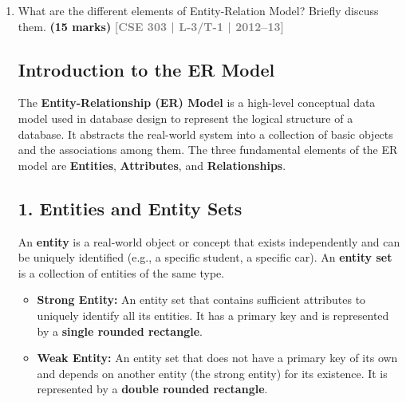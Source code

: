 \documentclass[12pt,a3paper]{article}
\newcommand{\yr}[1]{\hfill\textcolor{gray}{\small\textbf{[#1]}}}
\newcommand{\mk}[1]{\textcolor{orange!70!black}{\small\textbf{(#1 marks)}}}
\begin{document}
\begin{enumerate}
\begin{tcolorbox}[enhanced,breakable,ansbox,colback=cA!4,colframe=cA,boxrule=0.8pt,arc=5pt,title={\textbf{Answer}},fonttitle=\bfseries\color{white},colbacktitle=cA]
\textbf{Explanation of the Mapping:}
\begin{enumerate}
    \item \textbf{\texttt{EMPLOYEE(Emp\_ID, Name)}:} The original entity becomes a table, holding only the single-valued attributes. \texttt{Emp\_ID} remains the Primary Key.
    \item \textbf{\texttt{EMP\_SKILL(Emp\_ID, Skill)}:} The multi-valued attribute \texttt{Skill} gets its own table. To link the skill to the correct employee, we import \texttt{Emp\_ID} as a Foreign Key. Because one employee can have many skills, \texttt{Emp\_ID} alone is not unique in this new table. Therefore, the Primary Key for \texttt{EMP\_SKILL} is the composite key \texttt{(Emp\_ID, Skill)}.
\end{enumerate}

\end{tcolorbox}

\item What are the different elements of Entity-Relation Model? Briefly discuss them.
\mk{15} \yr{CSE 303 | L-3/T-1 | 2012--13}

\begin{tcolorbox}[enhanced,breakable,ansbox,colback=cA!4,colframe=cA,boxrule=0.8pt,arc=5pt,title={\textbf{Answer}},fonttitle=\bfseries\color{white},colbacktitle=cA]

\subsection*{Introduction to the ER Model}
The \textbf{Entity-Relationship (ER) Model} is a high-level conceptual data model used in database design to represent the logical structure of a database. It abstracts the real-world system into a collection of basic objects and the associations among them. The three fundamental elements of the ER model are \textbf{Entities}, \textbf{Attributes}, and \textbf{Relationships}.

\subsection*{1. Entities and Entity Sets}
An \textbf{entity} is a real-world object or concept that exists independently and can be uniquely identified (e.g., a specific student, a specific car). An \textbf{entity set} is a collection of entities of the same type.
\begin{itemize}
    \item \textbf{Strong Entity:} An entity set that contains sufficient attributes to uniquely identify all its entities. It has a primary key and is represented by a \textbf{single rounded rectangle}.
    \item \textbf{Weak Entity:} An entity set that does not have a primary key of its own and depends on another entity (the strong entity) for its existence. It is represented by a \textbf{double rounded rectangle}.
\end{itemize}


\end{tcolorbox}
\end{enumerate}
\end{document}
